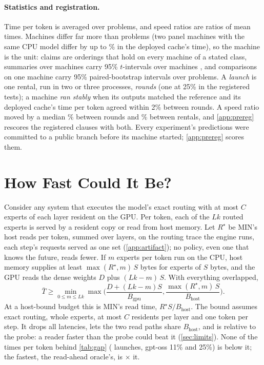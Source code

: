 \paragraph{Statistics and registration.} Time per token is averaged over problems, and speed ratios are ratios of mean
times. Machines differ far more than problems (two panel machines with the same CPU model differ by up to
\pnSameCpuDiffMax\% in the deployed cache's time), so the machine is the unit: claims are orderings that hold on every
machine of a stated class, summaries over machines carry 95\% $t$-intervals over machines \citep{kalibera2013rigorous},
and comparisons on one machine carry 95\% paired-bootstrap intervals over problems. A \emph{launch} is one rental, run
in two or three processes, \emph{rounds} (one at 25\% in the registered tests); a machine \emph{ran stably} when its
outputs matched the reference and its deployed cache's time per token agreed within 2\% between rounds. A speed ratio moved by a median \nzRoundMed\% between
rounds and \nzRentalMed\% between rentals, and \cref{app:prereg} rescores the registered clauses with both. Every
experiment's predictions were committed to a public branch before its machine started; \cref{app:prereg} scores them.

\section{How Fast Could It Be?}\label{sec:limit}
Consider any system that executes the model's exact routing with at most $C$ experts of each layer resident on the
GPU. Per token, each of the $Lk$ routed experts is served by a resident copy or read from host memory. Let $R^\star$ be
MIN's host reads per token, summed over layers, on the routing trace the engine runs, each step's requests served as one
set (\cref{app:artifact}); no policy, even one that knows the future, reads fewer. If $m$ experts
per token run on the CPU, host memory supplies at least $\max(R^\star,m)\,S$ bytes for experts of $S$ bytes, and the GPU
reads the dense weights $D$ plus $(Lk-m)\,S$. With everything overlapped,
\begin{equation}
\bar T \ge \min_{0\le m\le Lk}\max\!\Big(\frac{D+(Lk-m)S}{B_{\mathrm{gpu}}},\frac{\max(R^\star\!,m)\,S}{B_{\mathrm{host}}}\Big).
\label{eq:limit}
\end{equation}
At a host-bound budget this is MIN's read time, $R^\star S/B_{\mathrm{host}}$. The bound assumes exact routing, whole
experts, at most $C$ residents per layer and one token per step. It drops all latencies, lets the two read paths share
$B_{\mathrm{host}}$, and is relative to the probe: a reader faster than the probe could beat it (\cref{sec:limits}). None of the
\dmBoundRuns{} times per token behind \cref{tab:gap} (\dmBoundLaunchesN{} launches, gpt-oss 11\% and 25\%) is below it; the fastest, the read-ahead
oracle's, is \dmBoundMinOver$\times$ it.

